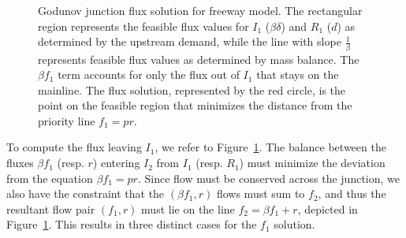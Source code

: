 \begin{figure}[t]
\hfill%
\hfill%
\caption[Godunov junction flux solution for freeway model.]{Godunov junction flux solution for freeway model. The rectangular region represents the feasible flux
values for $I_1$ ($\beta \delta$) and $R_1$ ($d$) as determined by the upstream demand, while
the line with slope $\frac{1}{\beta}$
represents feasible flux values as determined by mass balance. The
$\beta f_1$
term accounts for only the flux out of $I_1$
that stays on the mainline. The flux solution, represented by the
red circle, is the point on the feasible region that minimizes the
distance from the priority line $f_1 = p r$.}
\label{fig:Godunov-junction-flux}
\end{figure}

To compute the flux leaving $I_1$, we refer to Figure~\ref{fig:Godunov-junction-flux}. The balance between the fluxes $\beta f_1$ (resp. $r$) entering $I_2$  from $I_1$ (resp. $R_1$) must minimize the deviation from the equation $\beta f_1 = p r$. Since flow must be conserved across the junction, we also have the constraint that the $\left(\beta f_1, r\right)$ flows must sum to $f_2$, and thus the resultant flow pair $\left(f_1, r\right)$ must lie on the line $f_2 = \beta f_1 + r$, depicted in Figure~\ref{fig:Godunov-junction-flux}. This results in three distinct cases for the $f_1$ solution.


